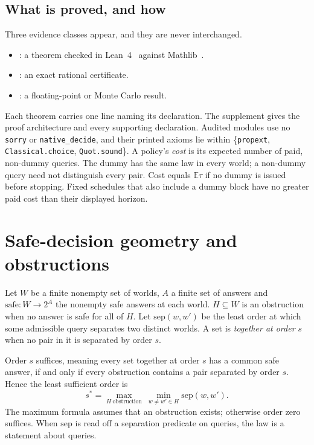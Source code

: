 \subsection{What is proved, and how}

Three evidence classes appear, and they are never interchanged.
\begin{itemize}
\item \PROVED: a theorem checked in Lean~4~\cite{demoura2021} against Mathlib~\cite{mathlib2020}.
\item \CERT: an exact rational certificate.
\item \NUM: a floating-point or Monte Carlo result.
\end{itemize}
Each theorem carries one line naming its declaration. The supplement gives the proof
architecture and every supporting declaration. Audited modules use no \texttt{sorry} or
\texttt{native\_decide}, and their printed axioms lie within \{\texttt{propext},
\texttt{Classical.choice}, \texttt{Quot.sound}\}. A policy's \emph{cost} is its expected
number of paid, non-dummy queries. The dummy has the same law in every world; a non-dummy
query need not distinguish every pair. Cost equals $\mathbb{E}\tau$ if no dummy is issued
before stopping. Fixed schedules that also include a dummy block have no greater paid cost
than their displayed horizon.

\section{Safe-decision geometry and obstructions}
\label{sec:geometry}

Let $W$ be a finite nonempty set of worlds, $A$ a finite set of answers and
$\mathrm{safe}:W\to 2^{A}$ the nonempty safe answers at each world. $H\subseteq W$ is an obstruction when no answer is
safe for all of $H$. Let $\mathrm{sep}(w,w')$ be the least order at which some admissible query
separates two distinct worlds. A set is \emph{together at order $s$} when no pair in it is
separated by order $s$.

\begin{theorem}
\label{thm:safelaw}
Order $s$ suffices, meaning every set together at order $s$ has a common safe answer, if and
only if every obstruction contains a pair separated by order $s$. Hence the least sufficient
order is
\[
s^{*}=\max_{H\ \text{obstruction}}\ \min_{w\ne w'\in H}\mathrm{sep}(w,w').
\]
The maximum formula assumes that an obstruction exists; otherwise order zero suffices.
When $\mathrm{sep}$ is read off a separation predicate on queries, the law is a statement about
queries.
\end{theorem}

